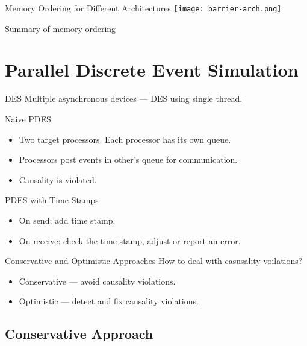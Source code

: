 \begin{frame}{Memory Ordering for Different Architectures}
  \centering
  \texttt{[image: barrier-arch.png]}

  \tiny{Summary of memory ordering~\cite{mckenney-memory-barriers}}
\end{frame}

\section{Parallel Discrete Event Simulation}

\begin{frame}{DES}
  Multiple asynchronous devices --- DES using single thread.
  \vfill
  \centering
\end{frame}

\begin{frame}{Naive PDES}
  \begin{itemize}
    \item Two target processors. Each processor has its own queue.
    \item Processors post events in other's queue for communication. \pause
    \item Causality is violated.
  \end{itemize}
  \centering
\end{frame}

\begin{frame}{PDES with Time Stamps}
  \begin{itemize}
    \item On send: add time stamp.
    \item On receive: check the time stamp, adjust or report an error.
  \end{itemize}
  \centering
\end{frame}

\begin{frame}{Conservative and Optimistic Approaches}
  How to deal with casusality voilations?
  \begin{itemize}
    \item Conservative --- avoid causality violations.
    \item Optimistic --- detect and fix causality violations.
  \end{itemize}
\end{frame}

\subsection{Conservative Approach}

